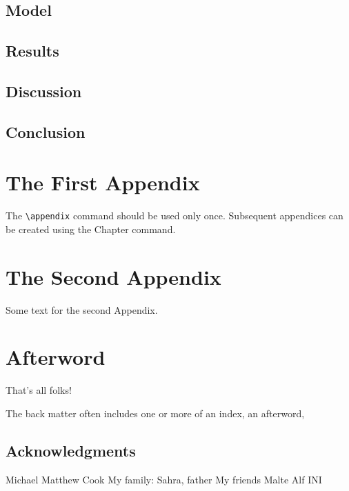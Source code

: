 \documentclass{report}%
\begin{document}
\section{Model}

\section{Results}

\section{Discussion}

\section{Conclusion}

\appendix

\chapter{The First Appendix}

The \verb"\appendix" command should be used only once. Subsequent appendices can
be created using the Chapter command.

\chapter{The Second Appendix}

Some text for the second Appendix.




\chapter{Afterword}

That's all folks!

The back matter often includes one or more of an index, an afterword,

\section{Acknowledgments}

Michael
Matthew Cook
My family: Sahra, father
My friends Malte Alf
INI
\end{document}
